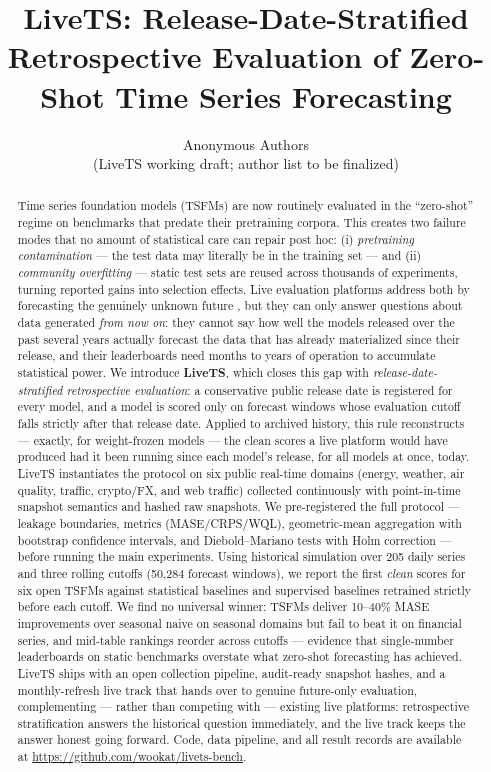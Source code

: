 \documentclass{article}
\title{LiveTS: Release-Date-Stratified Retrospective Evaluation of Zero-Shot Time Series Forecasting}
\author{%
  Anonymous Authors\\
  (LiveTS working draft; author list to be finalized)\\
}
\begin{document}
\maketitle

\begin{abstract}
Time series foundation models (TSFMs) are now routinely evaluated in the ``zero-shot'' regime on benchmarks that predate their pretraining corpora. This creates two failure modes that no amount of statistical care can repair post hoc: (i) \emph{pretraining contamination} --- the test data may literally be in the training set --- and (ii) \emph{community overfitting} --- static test sets are reused across thousands of experiments, turning reported gains into selection effects. Live evaluation platforms address both by forecasting the genuinely unknown future \citep{garza2026impermanent,meyer2026tsarena}, but they can only answer questions about data generated \emph{from now on}: they cannot say how well the models released over the past several years actually forecast the data that has already materialized since their release, and their leaderboards need months to years of operation to accumulate statistical power. We introduce \textbf{LiveTS}, which closes this gap with \emph{release-date-stratified retrospective evaluation}: a conservative public release date is registered for every model, and a model is scored only on forecast windows whose evaluation cutoff falls strictly after that release date. Applied to archived history, this rule reconstructs --- exactly, for weight-frozen models --- the clean scores a live platform would have produced had it been running since each model's release, for all models at once, today. LiveTS instantiates the protocol on six public real-time domains (energy, weather, air quality, traffic, crypto/FX, and web traffic) collected continuously with point-in-time snapshot semantics and hashed raw snapshots. We pre-registered the full protocol --- leakage boundaries, metrics (MASE/CRPS/WQL), geometric-mean aggregation with bootstrap confidence intervals, and Diebold--Mariano tests with Holm correction --- before running the main experiments. Using historical simulation over 205 daily series and three rolling cutoffs (50{,}284 forecast windows), we report the first \emph{clean} scores for six open TSFMs against statistical baselines and supervised baselines retrained strictly before each cutoff. We find no universal winner: TSFMs deliver 10--40\% MASE improvements over seasonal naive on seasonal domains but fail to beat it on financial series, and mid-table rankings reorder across cutoffs --- evidence that single-number leaderboards on static benchmarks overstate what zero-shot forecasting has achieved. LiveTS ships with an open collection pipeline, audit-ready snapshot hashes, and a monthly-refresh live track that hands over to genuine future-only evaluation, complementing --- rather than competing with --- existing live platforms: retrospective stratification answers the historical question immediately, and the live track keeps the answer honest going forward. Code, data pipeline, and all result records are available at \url{https://github.com/wookat/livets-bench}.
\end{abstract}
\end{document}
